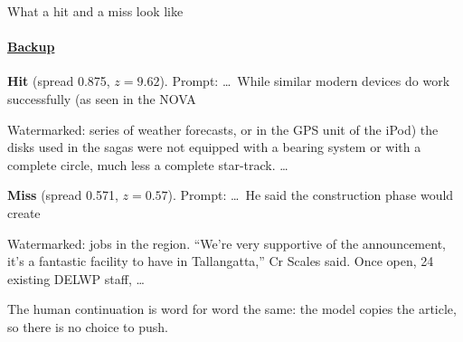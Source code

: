 \documentclass[aspectratio=169,10pt,t]{beamer}
\newcommand{\key}[1]{\textcolor{calblue}{\textbf{#1}}}
\newcommand{\quiet}[1]{\textcolor{muted}{#1}}
\newcommand{\warn}[1]{\textcolor{signal}{\textbf{#1}}}
\begin{document}
\begin{frame}[label=b10]{What a hit and a miss look like}
  \framesubtitle{\hyperlink{b0}{Backup}}
  \small
  \begin{goodbox}
    \key{Hit} (spread 0.875, $z = 9.62$). Prompt: \quiet{\ldots\ While similar modern devices do work successfully (as seen in the NOVA}\par\vspace{0.2em}
    Watermarked: series of weather forecasts, or in the GPS unit of the iPod) the disks used in the sagas were not equipped with a bearing system or with a complete circle, much less a complete star-track. \ldots
  \end{goodbox}
  \vspace{0.3em}
  \begin{signalbox}
    \warn{Miss} (spread 0.571, $z = 0.57$). Prompt: \quiet{\ldots\ He said the construction phase would create}\par\vspace{0.2em}
    Watermarked: jobs in the region. ``We're very supportive of the announcement, it's a fantastic facility to have in Tallangatta,'' Cr Scales said. Once open, 24 existing DELWP staff, \ldots\par\vspace{0.2em}
    \quiet{The human continuation is word for word the same: the model copies the article, so there is no choice to push.}
  \end{signalbox}
\end{frame}
\end{document}
